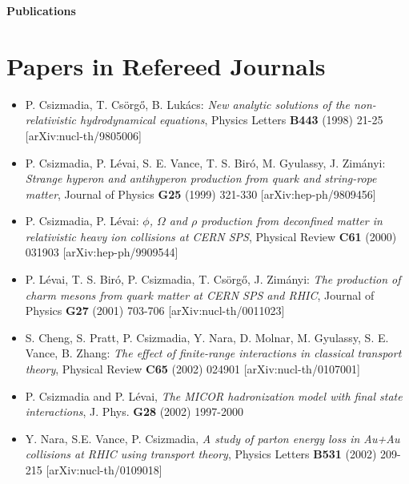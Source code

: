 \documentclass{article}[12pt]
\begin{document}
\newpage

\centerline{\bf\LARGE Publications}

\section*{Papers in Refereed Journals} %

\begin{itemize}

\item P. Csizmadia, T. Cs{\"o}rg{\H o}, B. Luk{\'a}cs: {\it New analytic
      solutions of the non-relativistic hydrodynamical equations},
      Physics Letters {\bf B443} (1998) 21-25  [arXiv:nucl-th/9805006]

\item P. Csizmadia, P. L{\'e}vai, S. E. Vance, T. S. Bir{\'o}, M. Gyulassy,
      J. Zim{\'a}nyi: {\it Strange hyperon and antihyperon production from
      quark and string-rope matter}, Journal of Physics {\bf G25} (1999)
      321-330 [arXiv:hep-ph/9809456]

\item P. Csizmadia, P. L{\'e}vai: {\it $\phi$, $\Omega$ and $\rho$ production
      from deconfined matter in relativistic heavy ion collisions at CERN SPS},
      Physical Review {\bf C61} (2000) 031903 [arXiv:hep-ph/9909544]

\item P. L{\'e}vai, T. S. Bir{\'o}, P. Csizmadia, T. Cs{\"o}rg{\H o}, J.
      Zim{\'a}nyi: {\it The production of charm mesons from quark matter at
      CERN SPS and RHIC}, Journal of Physics {\bf G27} (2001) 703-706
      [arXiv:nucl-th/0011023]

\item S. Cheng, S. Pratt, P. Csizmadia, Y. Nara, D. Molnar, M. Gyulassy,
      S. E. Vance, B. Zhang: {\it The effect of finite-range interactions in
      classical transport theory}, Physical Review {\bf C65} (2002) 024901
      [arXiv:nucl-th/0107001]

\item P. Csizmadia and P. L{\'e}vai, {\it The MICOR hadronization model with
      final state interactions}, J. Phys. {\bf G28} (2002) 1997-2000

\item Y. Nara, S.E. Vance, P. Csizmadia, {\it A study of parton energy loss in
      Au+Au collisions at RHIC using transport theory},
      Physics Letters {\bf B531} (2002) 209-215 [arXiv:nucl-th/0109018]


\end{itemize}
\end{document}
